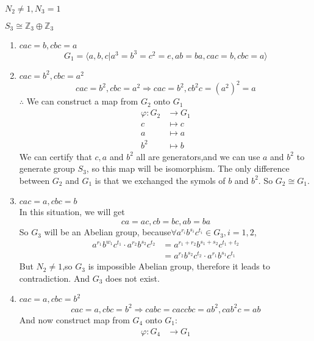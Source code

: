\documentclass[a4paper,14pt]{article}
\begin{document}
\begin{enumerate}
\begin{item}{$N_2 \neq 1, N_3 = 1$}
\begin{enumerate}
\begin{item}{$S_3\cong \mathbb{Z}_3 \oplus \mathbb{Z}_3$}
\begin{enumerate}
                         \item $cac=b,cbc=a$
                            $$ G_1 = \langle a,b,c|a^3=b^3=c^2=e,ab=ba,cac=b,cbc=a \rangle $$
                        \item $cac=b^2,cbc=a^2$
                            $$ cac=b^2, cbc=a^2 \Rightarrow cac=b^2,cb^2c=(a^2)^2=a $$
                            $\therefore$ We can construct a map from $G_2$ onto $G_1$
                            \begin{align*}
                                \varphi:G_2 &\to G_1\\
                                c &\longmapsto c\\
                                a &\longmapsto a\\
                                b^2 &\longmapsto b
                            \end{align*}
                            We can certify that $c,a$ and $b^2$ all are generators,and we can use $a$ and $b^2$ to generate group $S_3$, 
                            so this map will be isomorphism. The only difference between $G_2$ and $G_1$ is
                            that we exchanged the symols of $b$ and $b^2$. So $G_2 \cong G_1$.
                        \item $cac=a, cbc=b$\\
                            In this situation, we will get
                            \[ca=ac,cb=bc,ab=ba \]
                            So $G_3$ will be an Abelian group, because$\forall a^{r_i}b^{s_i}c^{t_i} \in G_3,i = 1,2$,\\
                            \begin{align*}
                                a^{r_1}b^{w_1}c^{t_1} \cdot a^{r_2}b^{s_2}c^{t_2} &= a^{r_1+r_2}b^{s_1+s_2}c^{t_1+t_2}\\
                                                    &= a^{r_2}b^{s_2}c^{t_2} \cdot a^{r_1}b^{s_1}c^{t_1}
                            \end{align*}
                            But $N_2 \neq 1$,so $G_3$ is impossible Abelian group, therefore it leads to contradiction. And $G_3$ does not exist.
                        \item $cac=a,cbc=b^2$
                            $$cac=a,cbc=b^2 \Rightarrow cabc=caccbc=ab^2,cab^2c=ab$$
                            And now construct map from $G_4$ onto $G_1$:
                            \begin{align*}
                                \varphi:G_4 &\to G_1\\

\end{align*}
\end{enumerate}
\end{item}
\end{enumerate}
\end{item}
\end{enumerate}
\end{document}
